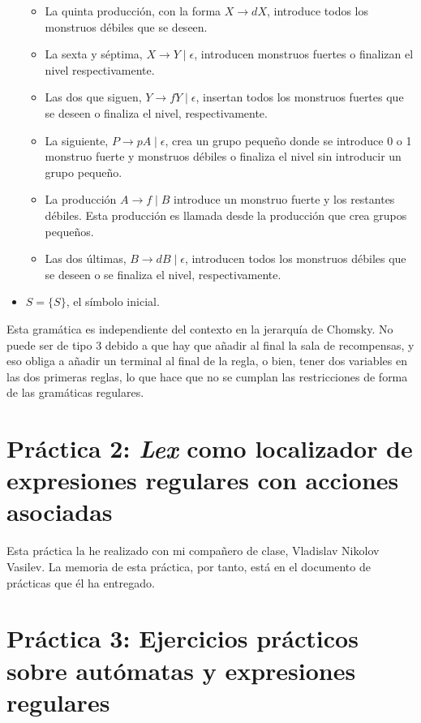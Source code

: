 \documentclass[11pt,a4paper]{article}
\begin{document}
\begin{itemize}
\begin{itemize}
			\item La quinta producción, con la forma $X\rightarrow dX$, introduce todos los monstruos débiles que se deseen.
			\item La sexta y séptima, $X\rightarrow Y \mid \epsilon$, introducen monstruos fuertes o finalizan el nivel respectivamente.
			\item Las dos que siguen, $Y\rightarrow fY \mid \epsilon$, insertan todos los monstruos fuertes que se deseen o finaliza el nivel, respectivamente.
			\item La siguiente, $P\rightarrow pA \mid \epsilon$, crea un grupo pequeño donde se introduce 0 o 1 monstruo fuerte y monstruos débiles o finaliza el nivel sin introducir un grupo pequeño.
			\item La producción $A\rightarrow f\mid B$ introduce un monstruo fuerte y los restantes débiles. Esta producción es llamada desde la producción que crea grupos pequeños.
			\item Las dos últimas, $B\rightarrow dB \mid \epsilon$, introducen todos los monstruos débiles que se deseen o se finaliza el nivel, respectivamente.
		\end{itemize}
		\item $S=\{S\}$, el símbolo inicial.
	\end{itemize}
	
Esta gramática es independiente del contexto en la jerarquía de Chomsky. No puede ser de tipo 3 debido a que hay que añadir al final la sala de recompensas, y eso obliga a añadir un terminal al final de la regla, o bien, tener dos variables en las dos primeras reglas, lo que hace que no se cumplan las restricciones de forma de las gramáticas regulares.\\
	
\section{Práctica 2: \textit{Lex} como localizador de expresiones regulares con acciones asociadas}
Esta práctica la he realizado con mi compañero de clase, Vladislav Nikolov Vasilev. La memoria de esta práctica, por tanto, está en el documento de prácticas que él ha entregado.

\newpage

\section{Práctica 3: Ejercicios prácticos sobre autómatas y expresiones regulares}
\end{document}
